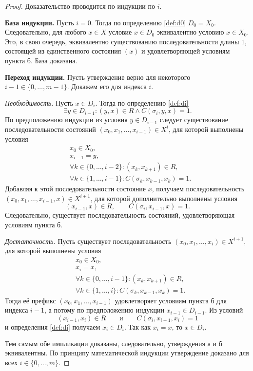 \begin{proof}
Доказательство проводится по индукции по $i$.

\textbf{База индукции.} Пусть $i=0$. Тогда по определению \ref{def:d0} $D_0 =
X_0$. Следовательно, для любого $x \in X$ условие $x \in D_0$ эквивалентно
условию $x \in X_0$. Это, в свою очередь, эквивалентно существованию
последовательности длины $1$, состоящей из единственного состояния $(x)$ и
удовлетворяющей условиям пункта б. База доказана.

\textbf{Переход индукции.}
Пусть утверждение верно для некоторого $i-1 \in \{0,\dots,m-1\}$. Докажем его
для индекса $i$.

\medskip

\noindent
\emph{Необходимость.}
Пусть $x \in D_i$. Тогда по определению \ref{def:di}
\[
\exists y \in D_{i-1} : (y,x) \in R \land C(\sigma_i,y,x)=1.
\]
По предположению индукции из условия $y \in D_{i-1}$ следует существование
последовательности состояний $(x_0,x_1,\dots,x_{i-1}) \in X^i$,
для которой выполнены условия
\[
\begin{aligned}
&x_0 \in X_0, \\
&x_{i-1} = y, \\
&\forall k \in \{0,\dots,i-2\} : (x_k,x_{k+1}) \in R, \\
&\forall k \in \{1,\dots,i-1\} : C(\sigma_k,x_{k-1},x_k)=1.
\end{aligned}
\]
Добавляя к этой последовательности состояние $x$, получаем последовательность
$(x_0,x_1,\dots,x_{i-1},x) \in X^{i+1}$, для которой дополнительно выполнены
условия
\[
(x_{i-1},x) \in R,
\qquad
C(\sigma_i,x_{i-1},x)=1.
\]
Следовательно, существует последовательность состояний, удовлетворяющая
условиям пункта б.

\noindent
\emph{Достаточность.}
Пусть существует последовательность $(x_0,x_1,\dots,x_i) \in X^{i+1}$, для
которой выполнены условия
\[
\begin{aligned}
&x_0 \in X_0, \\
&x_i = x, \\
&\forall k \in \{0,\dots,i-1\} : (x_k,x_{k+1}) \in R, \\
&\forall k \in \{1,\dots,i\} : C(\sigma_k,x_{k-1},x_k)=1.
\end{aligned}
\]
Тогда её префикс $(x_0,x_1,\dots,x_{i-1})$ удовлетворяет условиям пункта б для
индекса $i-1$, а потому по предположению индукции $x_{i-1} \in D_{i-1}$. Из
условий
\[
(x_{i-1},x_i) \in R
\qquad\text{и}\qquad
C(\sigma_i,x_{i-1},x_i)=1
\]
и определения \ref{def:di} получаем $x_i \in D_i$. Так как $x_i = x$, то $x \in
D_i$.

Тем самым обе импликации доказаны, следовательно, утверждения а и б
эквивалентны. По принципу математической индукции утверждение доказано для
всех $i \in \{0,\dots,m\}$.
\end{proof}

